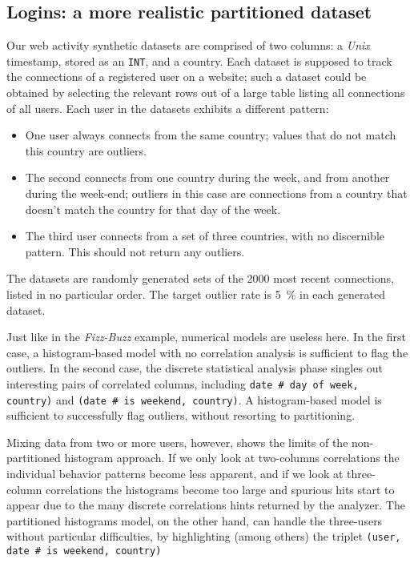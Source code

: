 \subsection{Logins: a more realistic partitioned dataset}

Our web activity synthetic datasets are comprised of two columns: a \emph{Unix} timestamp, stored as an \texttt{INT}, and a country. Each dataset is supposed to track the connections of a registered user on a website; such a dataset could be obtained by selecting the relevant rows out of a large table listing all connections of all users. Each user in the datasets exhibits a different pattern:

\begin{itemize}
\item One user always connects from the same country; values that do not match this country are outliers.
\item The second connects from one country during the week, and from another during the week-end; outliers in this case are connections from a country that doesn't match the country for that day of the week.
\item The third user connects from a set of three countries, with no discernible pattern. This should not return any outliers.
\end{itemize}

The datasets are randomly generated sets of the 2000 most recent connections, listed in no particular order. The target outlier rate is \SI{5}{\percent} in each generated dataset.

\newcommand{\prop}[2]{#1\,\#\,#2}

Just like in the \emph{Fizz-Buzz} example, numerical models are useless here. In the first case, a histogram-based model with no correlation analysis is sufficient to flag the outliers. In the second case, the discrete statistical analysis phase singles out interesting pairs of correlated columns, including \texttt{\prop{date}{day of week}, country)} and \texttt{(\prop{date}{is weekend}, country)}. A histogram-based model is sufficient to successfully flag outliers, without resorting to partitioning.


Mixing data from two or more users, however, shows the limits of the non-partitioned histogram approach. If we only look at two-columns correlations the individual behavior patterns become less apparent, and if we look at three-column correlations the histograms become too large and spurious hits start to appear due to the many discrete correlations hints returned by the analyzer. The partitioned histograms model, on the other hand, can handle the three-users without particular difficulties, by highlighting (among others) the triplet \texttt{(user, \prop{date}{is weekend}, country)}
